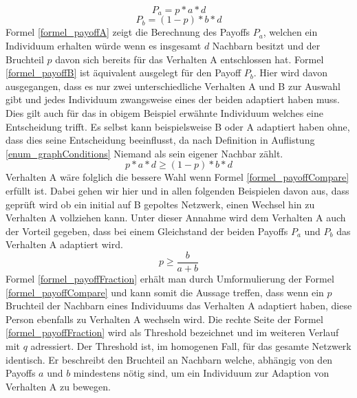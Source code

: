 \documentclass[12pt]{article}
\begin{document}
 \begin{equation}
 \label{formel_payoffA}
 P_a = p*a*d
 \end{equation}
 \begin{equation}
 \label{formel_payoffB}
 P_b = (1-p)*b*d
 \end{equation}
Formel \ref{formel_payoffA} zeigt die Berechnung des Payoffs $P_a$, welchen ein Individuum erhalten würde wenn es insgesamt $d$ Nachbarn besitzt und der Bruchteil $p$ davon sich bereits für das Verhalten A entschlossen hat. Formel \ref{formel_payoffB} ist äquivalent ausgelegt für den Payoff $P_b$. Hier wird davon ausgegangen, dass es nur zwei unterschiedliche Verhalten A und B zur Auswahl gibt und jedes Individuum zwangsweise eines der beiden adaptiert haben muss. Dies gilt auch für das in obigem Beispiel erwähnte Individuum welches eine Entscheidung trifft. Es selbst kann beispielsweise B oder A adaptiert haben ohne, dass dies seine Entscheidung beeinflusst, da nach Definition in Auflistung \ref{enum_graphConditions} Niemand als sein eigener Nachbar zählt.
  \begin{equation}
 \label{formel_payoffCompare}
 p*a*d \geq (1-p)*b*d
 \end{equation}
Verhalten A wäre folglich die bessere Wahl wenn Formel \ref{formel_payoffCompare} erfüllt ist. Dabei gehen wir hier und in allen folgenden Beispielen davon aus, dass geprüft wird ob ein initial auf B gepoltes Netzwerk, einen Wechsel hin zu Verhalten A vollziehen kann. Unter dieser Annahme wird dem Verhalten A auch der Vorteil gegeben, dass bei einem Gleichstand der beiden Payoffs $P_a$ und $P_b$ das Verhalten A adaptiert wird.
%
  \begin{equation}
 \label{formel_payoffFraction}
 p \geq \frac{b}{a+b}
 \end{equation}
Formel \ref{formel_payoffFraction} erhält man durch Umformulierung der Formel \ref{formel_payoffCompare} und kann somit die Aussage treffen, dass wenn ein $p$ Bruchteil der Nachbarn eines Individuums das Verhalten A adaptiert haben, diese Person ebenfalls zu Verhalten A wechseln wird. Die rechte Seite der Formel \ref{formel_payoffFraction} wird als Threshold bezeichnet und im weiteren Verlauf mit $q$ adressiert. Der Threshold ist, im homogenen Fall, für das gesamte Netzwerk identisch. Er beschreibt den Bruchteil an Nachbarn welche, abhängig von den Payoffs $a$ und $b$ mindestens nötig sind, um ein Individuum zur Adaption von Verhalten A zu bewegen.
\end{document}

